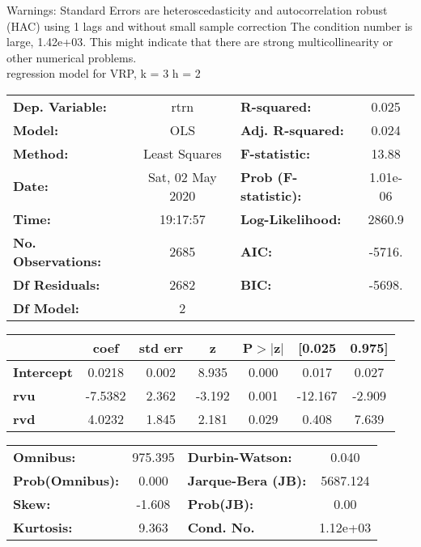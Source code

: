 Warnings: \newline
 [1] Standard Errors are heteroscedasticity and autocorrelation robust (HAC) using 1 lags and without small sample correction \newline
 [2] The condition number is large, 1.42e+03. This might indicate that there are \newline
 strong multicollinearity or other numerical problems.\\ 

regression model for VRP, k = 3 h = 2\begin{center}
\begin{tabular}{lclc}
\toprule
\textbf{Dep. Variable:}    &       rtrn       & \textbf{  R-squared:         } &     0.025   \\
\textbf{Model:}            &       OLS        & \textbf{  Adj. R-squared:    } &     0.024   \\
\textbf{Method:}           &  Least Squares   & \textbf{  F-statistic:       } &     13.88   \\
\textbf{Date:}             & Sat, 02 May 2020 & \textbf{  Prob (F-statistic):} &  1.01e-06   \\
\textbf{Time:}             &     19:17:57     & \textbf{  Log-Likelihood:    } &    2860.9   \\
\textbf{No. Observations:} &        2685      & \textbf{  AIC:               } &    -5716.   \\
\textbf{Df Residuals:}     &        2682      & \textbf{  BIC:               } &    -5698.   \\
\textbf{Df Model:}         &           2      & \textbf{                     } &             \\
\bottomrule
\end{tabular}
\begin{tabular}{lcccccc}
                   & \textbf{coef} & \textbf{std err} & \textbf{z} & \textbf{P$> |$z$|$} & \textbf{[0.025} & \textbf{0.975]}  \\
\midrule
\textbf{Intercept} &       0.0218  &        0.002     &     8.935  &         0.000        &        0.017    &        0.027     \\
\textbf{rvu}       &      -7.5382  &        2.362     &    -3.192  &         0.001        &      -12.167    &       -2.909     \\
\textbf{rvd}       &       4.0232  &        1.845     &     2.181  &         0.029        &        0.408    &        7.639     \\
\bottomrule
\end{tabular}
\begin{tabular}{lclc}
\textbf{Omnibus:}       & 975.395 & \textbf{  Durbin-Watson:     } &    0.040  \\
\textbf{Prob(Omnibus):} &   0.000 & \textbf{  Jarque-Bera (JB):  } & 5687.124  \\
\textbf{Skew:}          &  -1.608 & \textbf{  Prob(JB):          } &     0.00  \\
\textbf{Kurtosis:}      &   9.363 & \textbf{  Cond. No.          } & 1.12e+03  \\
\bottomrule
\end{tabular}
\end{center}

